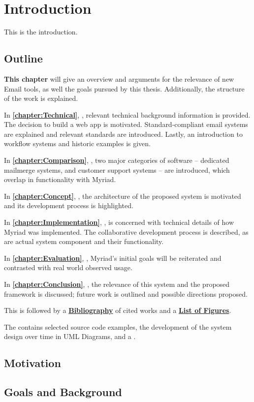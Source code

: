 \chapter{Introduction}
\label{chapter:Introduction}

This is the introduction.

\section{Outline}

\textbf{This chapter} will give an overview and arguments for the relevance of new Email tools, as well the goals pursued by this thesis. Additionally, the structure of the work is explained.

In \textbf{\autoref{chapter:Technical}}, \textbf{}, relevant technical background information is provided. The decision to build a web app is motivated. Standard-compliant email systems are explained and relevant standards are introduced. Lastly, an introduction to workflow systems and historic examples is given.

In \textbf{\autoref{chapter:Comparison}}, \textbf{},  two major categories of software -- dedicated mailmerge systems, and customer support systems -- are introduced, which overlap in functionality with Myriad.

In \textbf{\autoref{chapter:Concept}}, \textbf{}, the architecture of the proposed system is motivated and its development process is highlighted.

In \textbf{\autoref{chapter:Implementation}}, \textbf{}, is concerned with technical details of how Myriad was implemented. The collaborative development process is described, as are actual system component and their functionality.

In \textbf{\autoref{chapter:Evaluation}}, \textbf{}, Myriad's initial goals will be reiterated and contrasted with real world observed usage.

In \textbf{\autoref{chapter:Conclusion}}, \textbf{},  the relevance of this system and the proposed framework is discussed; future work is outlined and possible directions proposed.

This is followed by a \textbf{\hyperref[chapter:Bibliography]{Bibliography}} of cited works and a \textbf{\hyperref[chapter:Figures]{List of Figures}}.

The \textbf{} contains selected source code examples, the development of the system design over time in UML Diagrams, and a \textbf{}.



\section{Motivation}
\section{Goals and Background}